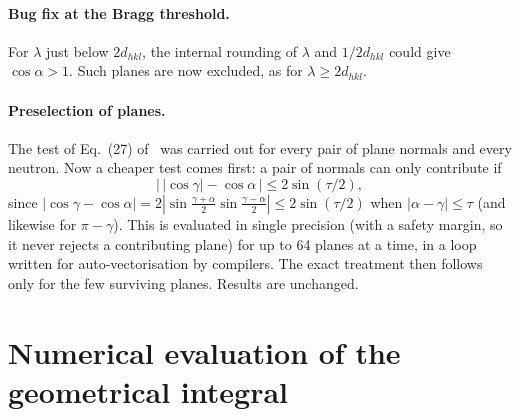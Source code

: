 \documentclass[11pt,a4paper]{article}
\newcommand{\Eq}[1]{Eq.~(#1) of~\cite{elastic}}
\begin{document}
\paragraph{Bug fix at the Bragg threshold.} For $\lambda$ just below
$2d_{hkl}$, the internal rounding of $\lambda$ and $1/2d_{hkl}$ could give
$\cos\alpha > 1$. Such planes are now excluded, as for $\lambda \ge
2d_{hkl}$.

\paragraph{Preselection of planes.} The test of \Eq{27} was carried out for
every pair of plane normals and every neutron. Now a cheaper test comes
first: a pair of normals can only contribute if
\begin{equation}
  \big|\,|\cos\gamma| - \cos\alpha\,\big| \le 2\sin(\tau/2),
\end{equation}
since $|\cos\gamma-\cos\alpha| = 2|\sin\frac{\gamma+\alpha}{2}
\sin\frac{\gamma-\alpha}{2}| \le 2\sin(\tau/2)$ when $|\alpha-\gamma| \le
\tau$ (and likewise for $\pi-\gamma$). This is evaluated in single precision
(with a safety margin, so it never rejects a contributing plane) for up to 64
planes at a time, in a loop written for auto-vectorisation by compilers. The
exact treatment then follows only for the few surviving planes. Results are
unchanged.

\section{Numerical evaluation of the geometrical integral}\label{sec:numint}
\end{document}
